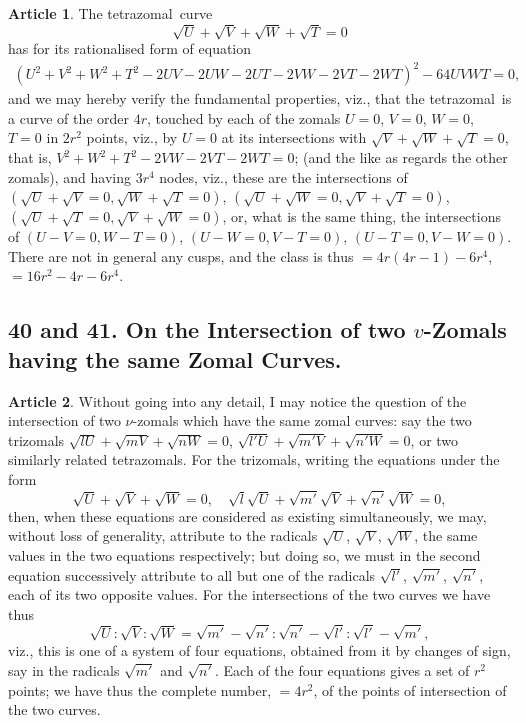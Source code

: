 \documentclass[11pt,a4paper]{article}
\theoremstyle{definition}
\newtheorem{art}{Article}
\newcommand{\tetrazomal}{tetrazomal}
\begin{document}
\begin{art}
The \tetrazomal\ curve
\[
\sqrt{U} + \sqrt{V} + \sqrt{W} + \sqrt{T} = 0
\]
has for its rationalised form of equation
\begin{multline*}
(U^{2} + V^{2} + W^{2} + T^{2} - 2UV - 2UW - 2UT - 2VW - 2VT - 2WT)^{2} - 64UVWT = 0,
\end{multline*}
and we may hereby verify the fundamental properties, viz., that the \tetrazomal\ is a curve of the order $4r$, touched by each of the zomals $U = 0$, $V = 0$, $W = 0$, $T = 0$ in $2r^{2}$ points, viz., by $U = 0$ at its intersections with $\sqrt{V} + \sqrt{W} + \sqrt{T} = 0$, that is, $V^{2} + W^{2} + T^{2} - 2VW - 2VT - 2WT = 0$; (and the like as regards the other zomals), and having $3r^{4}$ nodes, viz., these are the intersections of $(\sqrt{U} + \sqrt{V} = 0, \sqrt{W} + \sqrt{T} = 0)$, $(\sqrt{U} + \sqrt{W} = 0, \sqrt{V} + \sqrt{T} = 0)$, $(\sqrt{U} + \sqrt{T} = 0, \sqrt{V} + \sqrt{W} = 0)$, or, what is the same thing, the intersections of $(U - V = 0, W - T = 0)$, $(U - W = 0, V - T = 0)$, $(U - T = 0, V - W = 0)$. There are not in general any cusps, and the class is thus $= 4r(4r - 1) - 6r^{4}$, $= 16r^{2} - 4r - 6r^{4}$.
\end{art}

\subsection{40 and 41. On the Intersection of two $v$-Zomals having the same Zomal Curves.}

\begin{art}
Without going into any detail, I may notice the question of the intersection of two $\nu$-zomals which have the same zomal curves: say the two trizomals $\sqrt{lU} + \sqrt{mV} + \sqrt{nW} = 0$, $\sqrt{l'U} + \sqrt{m'V} + \sqrt{n'W} = 0$, or two similarly related tetrazomals. For the trizomals, writing the equations under the form
\[
\sqrt{U} + \sqrt{V} + \sqrt{W} = 0, \quad \sqrt{l}\sqrt{U} + \sqrt{m'}\sqrt{V} + \sqrt{n'}\sqrt{W} = 0,
\]
then, when these equations are considered as existing simultaneously, we may, without loss of generality, attribute to the radicals $\sqrt{U}$, $\sqrt{V}$, $\sqrt{W}$, the same values in the two equations respectively; but doing so, we must in the second equation successively attribute to all but one of the radicals $\sqrt{l'}$, $\sqrt{m'}$, $\sqrt{n'}$, each of its two opposite values. For the intersections of the two curves we have thus
\[
\sqrt{U} : \sqrt{V} : \sqrt{W} = \sqrt{m'} - \sqrt{n'} : \sqrt{n'} - \sqrt{l'} : \sqrt{l'} - \sqrt{m'},
\]
viz., this is one of a system of four equations, obtained from it by changes of sign, say in the radicals $\sqrt{m'}$ and $\sqrt{n'}$. Each of the four equations gives a set of $r^{2}$ points; we have thus the complete number, $= 4r^{2}$, of the points of intersection of the two curves.
\end{art}
\end{document}
